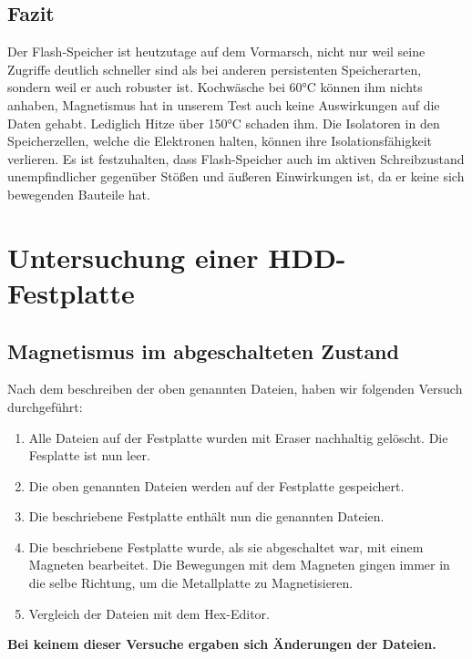 \documentclass[10pt,a4paper]{article} %
\begin{document}
\subsection{Fazit}

Der Flash-Speicher ist heutzutage auf dem Vormarsch, nicht nur weil seine Zugriffe deutlich schneller sind als bei anderen persistenten Speicherarten, sondern weil er auch robuster ist. Kochwäsche bei 60°C können ihm nichts anhaben, Magnetismus hat in unserem Test auch keine Auswirkungen auf die Daten gehabt. Lediglich Hitze über 150°C schaden ihm. Die Isolatoren in den Speicherzellen, welche die Elektronen halten, können ihre Isolationsfähigkeit verlieren. Es ist festzuhalten, dass Flash-Speicher auch im aktiven Schreibzustand unempfindlicher gegenüber Stößen und äußeren Einwirkungen ist, da er keine sich bewegenden Bauteile hat. 




\newpage
\section{Untersuchung einer HDD-Festplatte}

\subsection{Magnetismus im abgeschalteten Zustand}
Nach dem beschreiben der oben genannten Dateien, haben wir folgenden Versuch durchgeführt:
\begin{enumerate}
\item Alle Dateien auf der Festplatte wurden mit Eraser nachhaltig gelöscht. Die Fesplatte ist nun \glqq leer\grqq{}.
\item Die oben genannten Dateien werden auf der Festplatte gespeichert.
\item Die beschriebene Festplatte enthält nun die genannten Dateien.
\item Die beschriebene Festplatte wurde, als sie abgeschaltet war, mit einem Magneten bearbeitet. Die Bewegungen mit dem Magneten gingen immer in die selbe Richtung, um die Metallplatte zu Magnetisieren.
\item Vergleich der Dateien mit dem Hex-Editor. 
\end{enumerate}
\textbf{Bei keinem dieser Versuche ergaben sich Änderungen der Dateien.}\\\\
\end{document}
